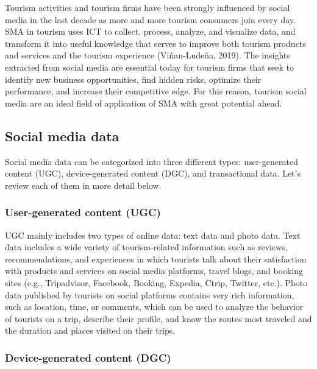 \documentclass[
  letterpaper,
  DIV=11,
  numbers=noendperiod]{scrreprt}
\begin{document}
Tourism activities and tourism firms have been strongly influenced by
social media in the last decade as more and more tourism consumers join
every day. SMA in tourism uses ICT to collect, process, analyze, and
visualize data, and transform it into useful knowledge that serves to
improve both tourism products and services and the tourism experience
(Viñan-Ludeña, 2019). The insights extracted from social media are
essential today for tourism firms that seek to identify new business
opportunities, find hidden risks, optimize their performance, and
increase their competitive edge. For this reason, tourism social media
are an ideal field of application of SMA with great potential ahead.

\hypertarget{social-media-data}{%
\subsection{Social media data}\label{social-media-data}}

Social media data can be categorized into three different types:
user-generated content (UGC), device-generated content (DGC), and
transactional data. Let's review each of them in more detail below.

\hypertarget{user-generated-content-ugc-1}{%
\subsubsection{User-generated content
(UGC)}\label{user-generated-content-ugc-1}}

UGC mainly includes two types of online data: text data and photo data.
Text data includes a wide variety of tourism-related information such as
reviews, recommendations, and experiences in which tourists talk about
their satisfaction with products and services on social media platforms,
travel blogs, and booking sites (e.g., Tripadvisor, Facebook, Booking,
Expedia, Ctrip, Twitter, etc.). Photo data published by tourists on
social platforms contains very rich information, such as location, time,
or comments, which can be used to analyze the behavior of tourists on a
trip, describe their profile, and know the routes most traveled and the
duration and places visited on their trips.

\hypertarget{device-generated-content-dgc}{%
\subsubsection{Device-generated content
(DGC)}\label{device-generated-content-dgc}}
\end{document}
